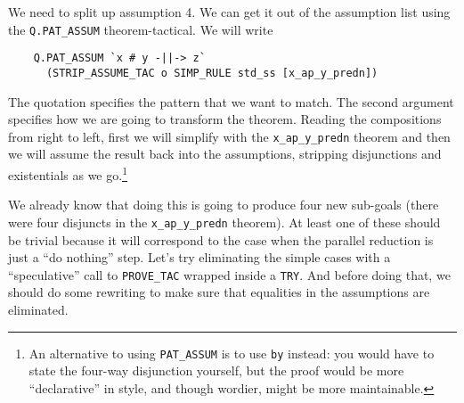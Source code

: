 We need to split up assumption 4.  We can get it out of the assumption
list using the \texttt{Q.PAT\_ASSUM} theorem-tactical.  We will write
\begin{verbatim}
    Q.PAT_ASSUM `x # y -||-> z`
      (STRIP_ASSUME_TAC o SIMP_RULE std_ss [x_ap_y_predn])
\end{verbatim}
The quotation specifies the pattern that we want to match.  The second
argument specifies how we are going to transform the theorem.  Reading
the compositions from right to left, first we will simplify with the
\verb!x_ap_y_predn! theorem and then we will assume the result back
into the assumptions, stripping disjunctions and existentials as we
go.\footnote{An alternative to using \texttt{PAT\_ASSUM} is to use
  \texttt{by} instead: you would have to state the four-way
  disjunction yourself, but the proof would be more ``declarative'' in
  style, and though wordier, might be more maintainable.}

We already know that doing this is going to produce four new sub-goals
(there were four disjuncts in the \verb!x_ap_y_predn! theorem).  At
least one of these should be trivial because it will correspond to the
case when the parallel reduction is just a ``do nothing'' step.  Let's
try eliminating the simple cases with a ``speculative'' call to
\texttt{PROVE\_TAC} wrapped inside a \texttt{TRY}.  And before doing
that, we should do some rewriting to make sure that equalities in the
assumptions are eliminated.

